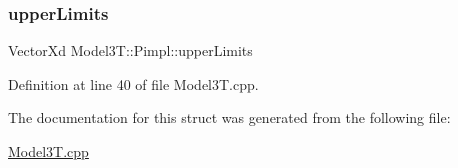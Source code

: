 \subsubsection{\texorpdfstring{upper\+Limits}{upperLimits}}
{\footnotesize\ttfamily Vector\+Xd Model3\+T\+::\+Pimpl\+::upper\+Limits}



Definition at line 40 of file Model3\+T.\+cpp.



The documentation for this struct was generated from the following file\+:\begin{DoxyCompactItemize}
\item 
\hyperlink{Model3T_8cpp}{Model3\+T.\+cpp}\end{DoxyCompactItemize}

